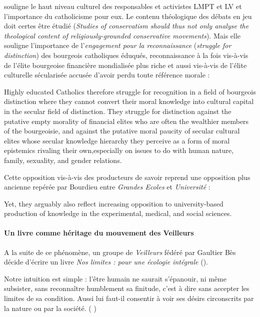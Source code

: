 \cite{geva_non_2019} souligne le haut niveau culturel des responsables et activistes LMPT et LV et l'importance du catholicisme pour eux. Le contenu théologique des débats en jeu doit certes être étudié (\textit{Studies of conservatism should thus not only analyse the theological content of religiously-grounded conservative movements}). Mais elle souligne l'importance de l'\textit{engagement pour la reconnaissance} (\textit{struggle for distinction}) des bourgeois catholiques éduqués, reconnaissance à la fois vis-à-vis de l'élite bourgeoise financière mondialisée plus riche et aussi vis-à-vis de l'élite culturelle sécularisée accusée d'avoir perdu toute référence morale : 
\begin{singlequote}
    Highly educated Catholics therefore struggle for recognition in a field of bourgeois distinction where they cannot convert their moral knowledge into cultural capital in the secular field of distinction. They struggle for distinction against the putative empty morality of financial elites who are often the wealthier members of the bourgeoisie, and against the putative moral paucity of secular cultural elites whose secular knowledge hierarchy they perceive as a form of moral epistemics rivaling their own,especially on issues to do with human nature, family, sexuality, and gender relations. 
    \end{singlequote}
Cette opposition vis-à-vis des producteurs de savoir reprend une opposition plus ancienne repérée par Bourdieu entre \textit{Grandes Ecoles} et \textit{Université} : 
    \begin{singlequote}
Yet, they arguably also reflect increasing opposition to university-based production of knowledge in the experimental, medical, and social sciences.
\end{singlequote}
 

\paragraph{Un livre comme héritage du mouvement des Veilleurs}
A la suite de ce phénomène, un groupe de \textit{Veilleurs} fédéré par Gaultier Bès  décide d'écrire un livre 
      \textit{Nos limites : pour une écologie
intégrale} (\cite{bes_nos_2014}). 
      \begin{singlequote}
      Notre intuition est simple : l'être humain ne saurait s'épanouir, ni même subsister, sans reconnaître humblement sa finitude, c'est à dire sans accepter les limites de sa condition.  Aussi lui faut-il consentir à voir ses désirs circonscrits par la nature ou par la société. ( \cite[p. 9]{bes_nos_2014})
  \end{singlequote}

